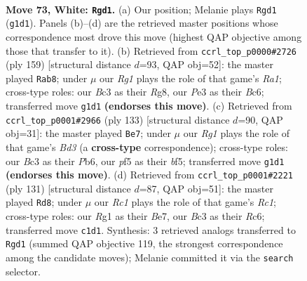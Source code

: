 \documentclass[11pt]{article}
\begin{document}
\clearpage

\begin{figure}[p]\centering
\begin{subfigure}{0.46\textwidth}\centering
\resizebox{\linewidth}{!}{%
\newchessgame
\chessboard[
  setfen={4k3/6p1/p2b2rr/Pppb1p1p/2p2P1P/2B1PNP1/1P3K2/2R3R1 w - - 18 73},
  showmover=false,
  pgfstyle=straightmove, color=movearrow, markmove={g1-d1}
]}
\caption{}
\end{subfigure}\hfill
\begin{subfigure}{0.46\textwidth}\centering
\resizebox{\linewidth}{!}{%
\newchessgame
\chessboard[
  setfen={r5r1/8/k1b3p1/pn1pPp1p/2pP1P2/2P2BR1/2P3P1/1RK1B3 b - - 5 80},
  showmover=false,
  pgfstyle=straightmove, color=movearrow, markmove={a8-b8}
]}
\caption{}
\end{subfigure}
\\[4pt]
\begin{subfigure}{0.46\textwidth}\centering
\resizebox{\linewidth}{!}{%
\newchessgame
\chessboard[
  setfen={8/r1r2pk1/1p1b1p1p/1P1p1B1P/2nP2P1/p3P3/R1R2P2/3KB3 b - - 55 67},
  showmover=false,
  pgfstyle=straightmove, color=movearrow, markmove={d6-e7}
]}
\caption{}
\end{subfigure}\hfill
\begin{subfigure}{0.46\textwidth}\centering
\resizebox{\linewidth}{!}{%
\newchessgame
\chessboard[
  setfen={2r5/p3bkp1/Ppr1p1p1/5pP1/3P1P1P/n1PB1K2/4R3/R3B3 b - - 46 66},
  showmover=false,
  pgfstyle=straightmove, color=movearrow, markmove={c8-d8}
]}
\caption{}
\end{subfigure}
\caption{\textbf{Move 73, White: \texttt{Rgd1}.} (a) Our position; Melanie plays \texttt{Rgd1} (\texttt{g1d1}). Panels (b)--(d) are the retrieved master positions whose correspondence most drove this move (highest QAP objective among those that transfer to it). (b) Retrieved from \texttt{ccrl\_top\_p0000\#2726} (ply 159) [structural distance $d$=93, QAP obj=52]: the master played \texttt{Rab8}; under $\mu$ our \emph{Rg1} plays the role of that game's \emph{Ra1}; cross-type roles: our \emph{B}c3 as their \emph{R}g8, our \emph{P}e3 as their \emph{B}c6; transferred move \texttt{g1d1} \textbf{(endorses this move)}. (c) Retrieved from \texttt{ccrl\_top\_p0001\#2966} (ply 133) [structural distance $d$=90, QAP obj=31]: the master played \texttt{Be7}; under $\mu$ our \emph{Rg1} plays the role of that game's \emph{Bd3} (a \textbf{cross-type} correspondence); cross-type roles: our \emph{B}c3 as their \emph{P}b6, our \emph{p}f5 as their \emph{b}f5; transferred move \texttt{g1d1} \textbf{(endorses this move)}. (d) Retrieved from \texttt{ccrl\_top\_p0001\#2221} (ply 131) [structural distance $d$=87, QAP obj=51]: the master played \texttt{Rd8}; under $\mu$ our \emph{Rc1} plays the role of that game's \emph{Rc1}; cross-type roles: our \emph{R}g1 as their \emph{B}e7, our \emph{B}c3 as their \emph{R}c6; transferred move \texttt{c1d1}. Synthesis: 3 retrieved analogs transferred to \texttt{Rgd1} (summed QAP objective 119, the strongest correspondence among the candidate moves); Melanie committed it via the \texttt{search} selector.}
\label{fig:thought-m144}
\end{figure}
\end{document}
